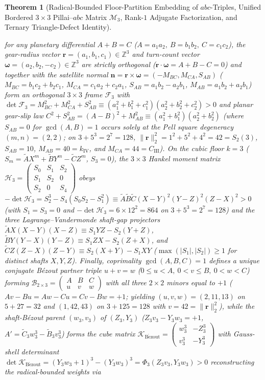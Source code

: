 \documentclass[11pt,a4paper]{article}
\theoremstyle{plain}
\newtheorem{theorem}{Theorem}[section]
\theoremstyle{definition}
\begin{document}
\begin{theorem}[Radical-Bounded Floor-Partition Embedding of $abc$-Triples, Unified Bordered $3\times 3$ Pillai--$abc$ Matrix $\mathcal{M}_3$, Rank-$1$ Adjugate Factorization, and Ternary Triangle-Defect Identity]
\begin{enumerate}[label=\textbf{(\roman*)},leftmargin=*]
  for any planetary differential $A + B = C$ ($A = a_1 a_2,\ B = b_1 b_2,\ C = c_1 c_2$), the gear-radius vector $\mathbf{r} = (a_1,b_1,c_1)\in\mathbb{Z}^3$ and turn-count vector $\mathbf{\omega} = (a_2,b_2,-c_2)\in\mathbb{Z}^3$ are strictly orthogonal ($\mathbf{r}\cdot\mathbf{\omega} = A+B-C = 0$) and together with the satellite normal $\mathbf{n} = \mathbf{r}\times\mathbf{\omega} = (-M_{BC},M_{CA},S_{AB})$ ($M_{BC} = b_1 c_2 + b_2 c_1$, $M_{CA} = c_1 a_2 + c_2 a_1$, $S_{AB} = a_1 b_2 - a_2 b_1$, $M_{AB} = a_1 b_2 + a_2 b_1$) form an orthogonal $3\times 3$ frame $\mathcal{F}_3$ with $\det\mathcal{F}_3 = M_{BC}^2 + M_{CA}^2 + S_{AB}^2 \equiv (a_1^2+b_1^2+c_1^2)(a_2^2+b_2^2+c_2^2) > 0$ and planar gear-slip law $C^2 + S_{AB}^2 = (A-B)^2 + M_{AB}^2 \equiv (a_1^2+b_1^2)(a_2^2+b_2^2)$ (where $S_{AB}=0$ for $\gcd(A,B)=1$ occurs solely at the Pell square degeneracy $(m,n)=(2,2)$; on $3+5^3=2^7=128$, $\|\mathbf{r}\|_2^2 = 1^2+5^2+4^2 = 42 = S_2(3)$, $S_{AB}=10$, $M_{AB}=40=k_{\mathrm{IV}}$, and $M_{CA}=44=C_{\mathrm{III}}$). On the cubic floor $k=3$ ($S_m = \widetilde{A}X^m + \widetilde{B}Y^m - \widetilde{C}Z^m$, $S_3 = 0$), the $3\times 3$ Hankel moment matrix $\mathcal{H}_3 = \begin{pmatrix} S_0 & S_1 & S_2 \\ S_1 & S_2 & 0 \\ S_2 & 0 & S_4 \end{pmatrix}$ obeys $-\det\mathcal{H}_3 = S_2^3 - S_4(S_0 S_2 - S_1^2) \equiv \widetilde{A}\widetilde{B}\widetilde{C}(X-Y)^2(Y-Z)^2(Z-X)^2 > 0$ (with $S_1 = S_3 = 0$ and $-\det\mathcal{H}_3 = 6\times 12^2 = 864$ on $3+5^3=2^7=128$) and the three Lagrange--Vandermonde shaft-gap projectors $\widetilde{A}X(X-Y)(X-Z) \equiv S_1 YZ - S_2(Y+Z)$, $\widetilde{B}Y(Y-X)(Y-Z) \equiv S_1 ZX - S_2(Z+X)$, and $\widetilde{C}Z(Z-X)(Z-Y) \equiv S_2(X+Y) - S_1 XY$ ($\max(|S_1|,|S_2|)\ge 1$ for distinct shafts $X,Y,Z$). Finally, coprimality $\gcd(A,B,C)=1$ defines a unique conjugate B\'ezout partner triple $u+v=w$ ($0\le u < A,\ 0 < v \le B,\ 0 < w < C$) forming $\mathcal{B}_{2\times 3} = \begin{pmatrix} A & B & C \\ u & v & w \end{pmatrix}$ with all three $2\times 2$ minors equal to $+1$ ($Av-Bu = Aw-Cu = Cv-Bw = +1$; yielding $(u,v,w) = (2,11,13)$ on $5+27=32$ and $(1,42,43)$ on $3+125=128$ with $v=42=\|\mathbf{r}\|_2^2$), while the shaft-B\'ezout parent $(w_3,v_3)$ of $(Z_3,Y_3)$ ($Z_3 v_3 - Y_3 w_3 = +1$, $A' = \widetilde{C}_3 w_3^3 - \widetilde{B}_3 v_3^3$) forms the cube matrix $\mathcal{K}_{\mathrm{B\acute{e}zout}} = \begin{pmatrix} w_3^3 & -Z_3^3 \\ v_3^3 & -Y_3^3 \end{pmatrix}$ with Gauss-shell determinant $\det\mathcal{K}_{\mathrm{B\acute{e}zout}} = (Y_3 w_3+1)^3 - (Y_3 w_3)^3 = \Phi_3(Z_3 v_3, Y_3 w_3) > 0$ reconstructing the radical-bounded weights via 
\end{enumerate}
\end{theorem}
\end{document}
